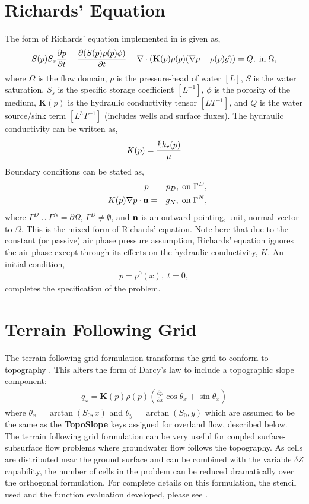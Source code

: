 \section{Richards' Equation}
\label{Richards' Equation}

The form of Richards' equation implemented in \parflow{} is given as,
\begin{eqnarray}
S(p)S_s\frac{\partial p}{\partial t} -
\frac{\partial (S(p)\rho(p)\phi)}{\partial t}
- \nabla \cdot (\textbf{K}(p)\rho(p)(\nabla p - \rho(p) {\vec g})) = Q, \;  {\rm in} \; \Omega,
\label{eq:richard}
\end{eqnarray}
where $\Omega$ is the flow domain, $p$ is the pressure-head of water $[L]$, $S$ is the water
saturation, $S_s$ is the specific storage coefficient $[L^{-1}]$, $\phi$ is the porosity of the medium, $\textbf{K}(p)$ is the hydraulic
conductivity tensor $[LT^{-1}]$, and $Q$ is the water source/sink term $[L^{3}T^{-1}]$ (includes wells and surface fluxes).
The hydraulic conductivity can be written as,
\begin{eqnarray}
K(p) =  \frac{{\bar k} k_r(p)}{\mu}
\end{eqnarray}
Boundary conditions can be stated as,
\begin{eqnarray}
p & = & p_D, \; {\rm on} \; \Gamma^D, \label{eq:bcd} \\
-K(p)\nabla p \cdot {\bf n} & = &
g_N, \; {\rm on} \; \Gamma^N, \label{eq:bcn}
\end{eqnarray}
where $\Gamma^D \cup \Gamma^N = \partial \Omega$, $\Gamma^D \neq \emptyset$,
and ${\bf n}$ is an outward pointing, unit, normal vector to $\Omega$.
This is the mixed form of Richards' equation.
Note here that due to the constant (or passive) air phase pressure assumption,
Richards' equation ignores the air phase except through its
effects on the hydraulic conductivity, $K$.
An initial condition,
\begin{eqnarray}
p = p^0(x), \; t = 0,
\end{eqnarray}
completes the specification of the problem.
\section{Terrain Following Grid}
\label{TFG}
The terrain following grid formulation transforms the \parflow{} grid to conform to topography \cite{M13}. This alters the form of Darcy's law to include a topographic slope component:
\begin{eqnarray}
q_x=\textbf{K}(p)\rho(p)(\frac{\partial p}{\partial x}\cos \theta_x + \sin \theta_x)
\label{eq:darcyTFG}
\end{eqnarray}
where $\theta_x = \arctan(S_0,x)$ and $\theta_y = \arctan(S_0,y)$ which are assumed to be the same as the {\bf TopoSlope} keys assigned for overland flow, described below.  The terrain following grid formulation can be very useful for coupled surface-subsurface flow problems where groundwater flow follows the topography.  As cells are distributed near the ground surface and can be combined with the variable $\delta Z$ capability, the number of cells in the problem can be reduced dramatically over the orthogonal formulation. For complete details on this formulation, the stencil used and the function evaluation developed, please see \cite{M13}.
